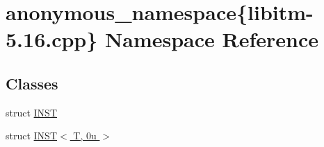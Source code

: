 \hypertarget{namespaceanonymous__namespace_02libitm-5_816_8cpp_03}{\section{anonymous\-\_\-namespace\{libitm-\/5.16.cpp\} Namespace Reference}
\label{namespaceanonymous__namespace_02libitm-5_816_8cpp_03}
}
\subsection*{Classes}
\begin{DoxyCompactItemize}
\item 
struct \hyperlink{structanonymous__namespace_02libitm-5_816_8cpp_03_1_1INST}{I\-N\-S\-T}
\item 
struct \hyperlink{structanonymous__namespace_02libitm-5_816_8cpp_03_1_1INST_3_01T_00_010u_01_4}{I\-N\-S\-T$<$ T, 0u $>$}
\end{DoxyCompactItemize}
